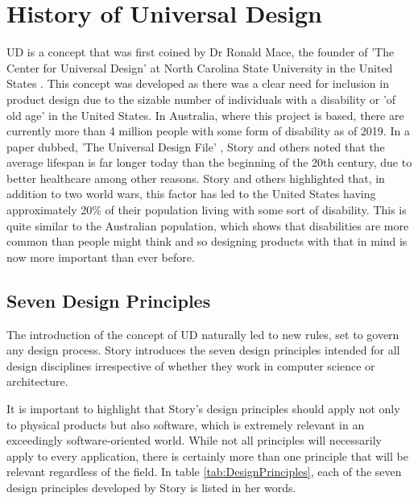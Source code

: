 \section{History of Universal Design} \label{History}
UD is a concept that was first coined by Dr Ronald Mace, the founder of 'The Center for Universal Design' at North Carolina State University in the United States \cite{ronald}.
This concept was developed as there was a clear need for inclusion in product design due to the sizable number of individuals with a disability or 'of old age' in the United States.
In Australia, where this project is based, there are currently more than 4 million people with some form of disability \cite{ausstats} as of 2019. 
In a paper dubbed, 'The Universal Design File' \cite{universalfile}, Story and others noted that the average lifespan is far longer today than the beginning of the 20th century, due to better healthcare among other reasons.
Story and others highlighted that, in addition to two world wars, this factor has led to the United States having approximately 20\% of their population living with some sort of disability.
This is quite similar to the Australian population, which shows that disabilities are more common than people might think and so designing products with that in mind is now more important than ever before.

\subsection{Seven Design Principles}

The introduction of the concept of UD naturally led to new rules, set to govern any design process.
Story introduces the seven design principles \cite{sevenprinciples} intended for all design disciplines irrespective of whether they work in computer science or architecture.

It is important to highlight that Story's design principles should apply not only to physical products but also software, which is extremely relevant in an exceedingly software-oriented world.
While not all principles will necessarily apply to every application, there is certainly more than one principle that will be relevant regardless of the field.
In table \ref{tab:DesignPrinciples}, each of the seven design principles developed by Story is listed in her words.

